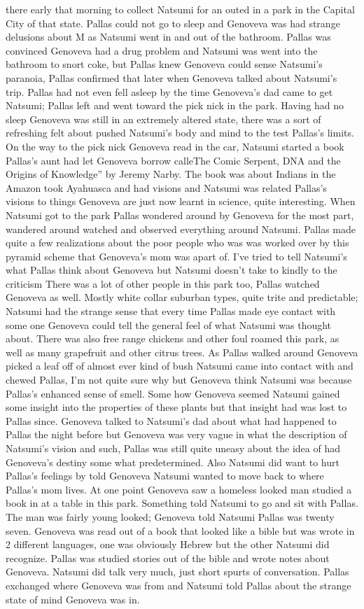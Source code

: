 \documentclass[12pt]{book}
\begin{document}
there early that morning to collect Natsumi for an outed in a park in the Capital City of that state. Pallas could not go to sleep and Genoveva was had strange delusions about M as Natsumi went in and out of the bathroom. Pallas was convinced Genoveva had a drug problem and Natsumi was went into the bathroom to snort coke, but Pallas knew Genoveva could sense Natsumi's paranoia, Pallas confirmed that later when Genoveva talked about Natsumi's trip. Pallas had not even fell asleep by the time Genoveva's dad came to get Natsumi; Pallas left and went toward the pick nick in the park. Having had no sleep Genoveva was still in an extremely altered state, there was a sort of refreshing felt about pushed Natsumi's body and mind to the test Pallas's limits. On the way to the pick nick Genoveva read in the car, Natsumi started a book Pallas's aunt had let Genoveva borrow calleThe Comic Serpent, DNA and the Origins of Knowledge'' by Jeremy Narby. The book was about Indians in the Amazon took Ayahuasca and had visions and Natsumi was related Pallas's visions to things Genoveva are just now learnt in science, quite interesting. When Natsumi got to the park Pallas wondered around by Genoveva for the most part, wandered around watched and observed everything around Natsumi. Pallas made quite a few realizations about the poor people who was was worked over by this pyramid scheme that Genoveva's mom was apart of. I've tried to tell Natsumi's what Pallas think about Genoveva but Natsumi doesn't take to kindly to the criticism There was a lot of other people in this park too, Pallas watched Genoveva as well. Mostly white collar suburban types, quite trite and predictable; Natsumi had the strange sense that every time Pallas made eye contact with some one Genoveva could tell the general feel of what Natsumi was thought about. There was also free range chickens and other foul roamed this park, as well as many grapefruit and other citrus trees. As Pallas walked around Genoveva picked a leaf off of almost ever kind of bush Natsumi came into contact with and chewed Pallas, I'm not quite sure why but Genoveva think Natsumi was because Pallas's enhanced sense of smell. Some how Genoveva seemed Natsumi gained some insight into the properties of these plants but that insight had was lost to Pallas since. Genoveva talked to Natsumi's dad about what had happened to Pallas the night before but Genoveva was very vague in what the description of Natsumi's vision and such, Pallas was still quite uneasy about the idea of had Genoveva's destiny some what predetermined. Also Natsumi did want to hurt Pallas's feelings by told Genoveva Natsumi wanted to move back to where Pallas's mom lives. At one point Genoveva saw a homeless looked man studied a book in at a table in this park. Something told Natsumi to go and sit with Pallas. The man was fairly young looked; Genoveva told Natsumi Pallas was twenty seven. Genoveva was read out of a book that looked like a bible but was wrote in 2 different languages, one was obviously Hebrew but the other Natsumi did recognize. Pallas was studied stories out of the bible and wrote notes about Genoveva. Natsumi did talk very much, just short spurts of conversation. Pallas exchanged where Genoveva was from and Natsumi told Pallas about the strange state of mind Genoveva was in. 
\end{document}
